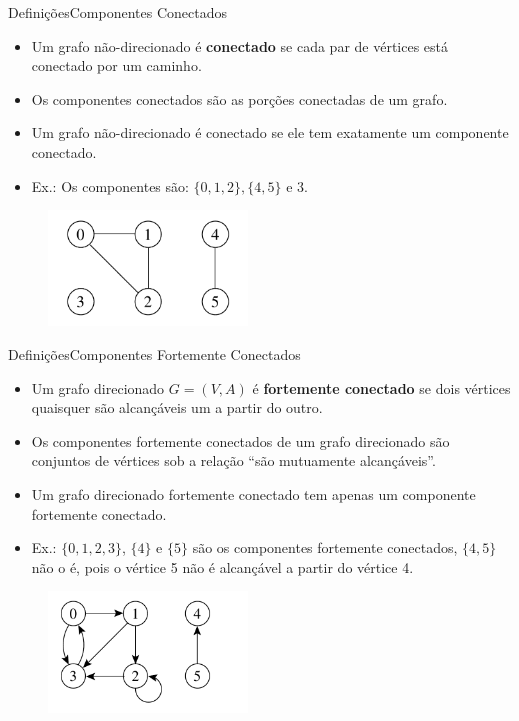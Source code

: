 \documentclass[aspectratio=169]{beamer}
\begin{document}

\begin{frame}{Definições}{Componentes Conectados}
\begin{itemize}
\item Um grafo não-direcionado é {\bf conectado} se cada par de vértices está conectado por um caminho.
\item Os componentes conectados são as porções conectadas de um grafo.
\item Um grafo não-direcionado é conectado se ele tem exatamente um componente conectado.
\item Ex.: Os componentes são: $\{0, 1, 2\}, \{4, 5\}$ e  ${3}$.
\end{itemize}
\begin{figure}[!h]
  \centering
  \includegraphics[width=150pt]{imagens/exemplo_grafo_nao_direcionado.png}
  \label{fig_exemplo_componente_conectado}
\end{figure}
\end{frame}
 

\begin{frame}{Definições}{Componentes Fortemente Conectados}
\begin{itemize}
\item Um grafo direcionado $G = (V, A)$ é {\bf fortemente conectado} se dois vértices quaisquer são alcançáveis um a partir do outro.
\item Os componentes fortemente conectados de um grafo direcionado são conjuntos de vértices sob a relação ``são mutuamente alcançáveis''.
\item Um grafo direcionado fortemente conectado tem apenas um componente fortemente conectado.
\item Ex.: $\{0, 1, 2, 3\}$, $\{4\}$ e $\{5\}$ são os componentes fortemente conectados, $\{4, 5\}$ não o é, pois o vértice 5 não é alcançável a partir do vértice 4.

\end{itemize}
\begin{figure}[!h]
  \centering
  \includegraphics[width=150pt]{imagens/exemplo_grafo_direcionado.png}
  \label{fig_exemplo_componente_fortemente_conectado}
\end{figure}
\end{frame}
\end{document}
